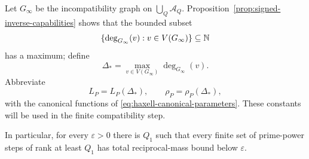 Let $G_{\infty}$ be the incompatibility graph on $\bigcup_Q\mathcal A_Q$.  Proposition~\ref{prop:signed-inverse-capabilities} shows that the bounded subset
\[
\{\deg_{G_{\infty}}(v):v\in V(G_{\infty})\}\subseteq\mathbb N
\]
has a maximum; define
\begin{equation}\label{eq:canonical-global-degree}
\Delta_*=\max_{v\in V(G_{\infty})}\deg_{G_{\infty}}(v).
\end{equation}
Abbreviate
\begin{equation}\label{eq:packing-constants}
L_P=L_P(\Delta_*),
\qquad
\rho_P=\rho_P(\Delta_*),
\end{equation}
with the canonical functions of \eqref{eq:haxell-canonical-parameters}.  These constants will be used in the finite compatibility step.

In particular, for every $\varepsilon>0$ there is $Q_1$ such that every finite set of prime-power steps of rank at least $Q_1$ has total reciprocal-mass bound below $\varepsilon$.
